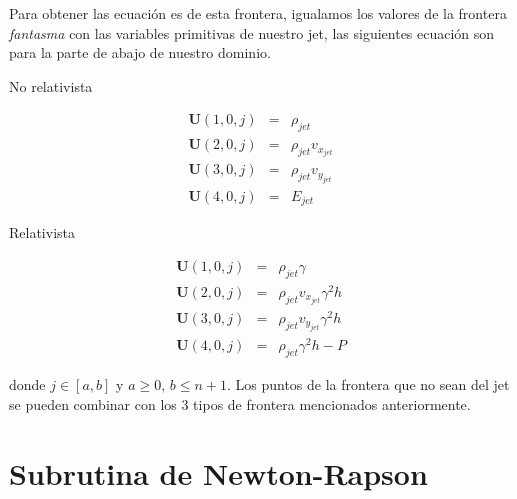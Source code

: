 \documentclass[12pt,a4paper]{book}
\begin{document}
Para obtener las ecuación es de esta frontera, igualamos los valores de la frontera \emph{fantasma} con las variables primitivas de nuestro jet, las siguientes ecuación son para la parte de abajo de nuestro dominio.

No relativista

\begin{eqnarray}
\textbf{U}(1,0,j)&=&\rho_{jet} \\
\textbf{U}(2,0,j)&=& \rho_{jet} v_{x_{jet}}\\
\textbf{U}(3,0,j)&=& \rho_{jet} v_{y_{jet}}\\
\textbf{U}(4,0,j)&=& E_{jet}
\end{eqnarray}

Relativista

\begin{eqnarray}
\textbf{U}(1,0,j)&=&\rho_{jet} \gamma \\
\textbf{U}(2,0,j)&=& \rho_{jet} v_{x_{jet}} \gamma^2 h \\
\textbf{U}(3,0,j)&=& \rho_{jet} v_{y_{jet}} \gamma^2 h \\
\textbf{U}(4,0,j)&=& \rho_{jet} \gamma^2 h-P
\end{eqnarray}

donde $j\in \left[ a,b \right]$ y $a\geq 0, \, b\leq n+1$. Los puntos de la frontera que no sean del jet se pueden combinar con los 3 tipos de frontera mencionados anteriormente.


\chapter{Subrutina de Newton-Rapson}\label{ap_newrap}
\end{document}
